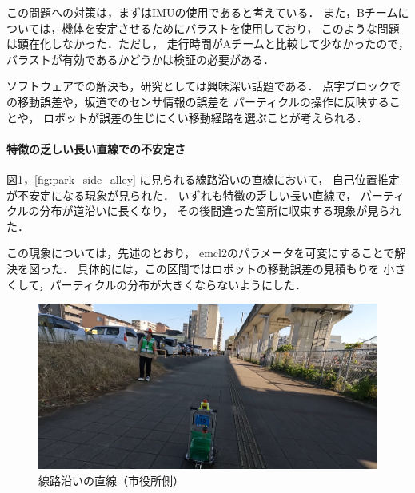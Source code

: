 \documentclass[twocolumn,9pt]{jsproceedings}
\begin{document}
この問題への対策は，まずはIMUの使用であると考えている．
また，Bチームについては，機体を安定させるためにバラストを使用しており，
このような問題は顕在化しなかった．ただし，
走行時間がAチームと比較して少なかったので，
バラストが有効であるかどうかは検証の必要がある．

ソフトウェアでの解決も，研究としては興味深い話題である．
点字ブロックでの移動誤差や，坂道でのセンサ情報の誤差を
パーティクルの操作に反映することや，
ロボットが誤差の生じにくい移動経路を選ぶことが考えられる．

\paragraph{特徴の乏しい長い直線での不安定さ}


図\ref{fig:city_hall_side_alley}，\ref{fig:park_side_alley}
に見られる線路沿いの直線において，
自己位置推定が不安定になる現象が見られた．
いずれも特徴の乏しい長い直線で，
パーティクルの分布が道沿いに長くなり，
その後間違った箇所に収束する現象が見られた．

この現象については，先述のとおり，
emcl2のパラメータを可変にすることで解決を図った．
具体的には，この区間ではロボットの移動誤差の見積もりを
小さくして，パーティクルの分布が大きくならないようにした．

\begin{figure}[h]
  \begin{center}
    \includegraphics[width=1.0\linewidth]{figs/city_hall_side_alley.pdf}
	  \caption{線路沿いの直線（市役所側）}
    \label{fig:city_hall_side_alley}
  \end{center}
\end{figure}
\end{document}
